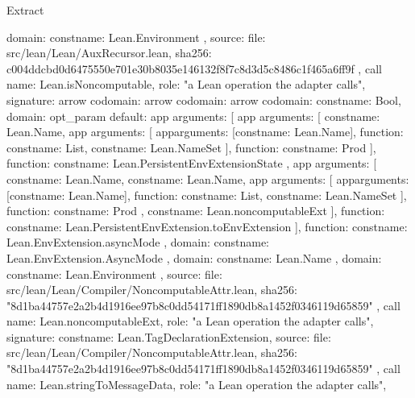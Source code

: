 \begin{lexlean}{Extract}
\begin{toolingmodule}
{{{        domain: const{name: Lean.Environment}
      },
      source: {
        file: src/lean/Lean/AuxRecursor.lean,
        sha256: c004ddcbd0d6475550e701e30b8035e146132f8f7c8d3d5c8486c1f465a6ff9f
      }
    },
    call{
      name: Lean.isNoncomputable,
      role: "a Lean operation the adapter calls",
      signature: arrow{
        codomain: arrow{
          codomain: arrow{
            codomain: const{name: Bool},
            domain: opt_param{
              default: app{
                arguments: [
                  app{
                    arguments: [
                      const{name: Lean.Name},
                      app{
                        arguments: [
                          app{arguments: [const{name: Lean.Name}], function: const{name: List}},
                          const{name: Lean.NameSet}
                        ],
                        function: const{name: Prod}
                      }
                    ],
                    function: const{name: Lean.PersistentEnvExtensionState}
                  },
                  app{
                    arguments: [
                      const{name: Lean.Name},
                      const{name: Lean.Name},
                      app{
                        arguments: [
                          app{arguments: [const{name: Lean.Name}], function: const{name: List}},
                          const{name: Lean.NameSet}
                        ],
                        function: const{name: Prod}
                      },
                      const{name: Lean.noncomputableExt}
                    ],
                    function: const{name: Lean.PersistentEnvExtension.toEnvExtension}
                  }
                ],
                function: const{name: Lean.EnvExtension.asyncMode}
              },
              domain: const{name: Lean.EnvExtension.AsyncMode}
            }
          },
          domain: const{name: Lean.Name}
        },
        domain: const{name: Lean.Environment}
      },
      source: {
        file: src/lean/Lean/Compiler/NoncomputableAttr.lean,
        sha256: "8d1ba44757e2a2b4d1916ee97b8c0dd54171ff1890db8a1452f0346119d65859"
      }
    },
    call{
      name: Lean.noncomputableExt,
      role: "a Lean operation the adapter calls",
      signature: const{name: Lean.TagDeclarationExtension},
      source: {
        file: src/lean/Lean/Compiler/NoncomputableAttr.lean,
        sha256: "8d1ba44757e2a2b4d1916ee97b8c0dd54171ff1890db8a1452f0346119d65859"
      }
    },
    call{
      name: Lean.stringToMessageData,
      role: "a Lean operation the adapter calls",
}}
\end{toolingmodule}
\end{lexlean}

